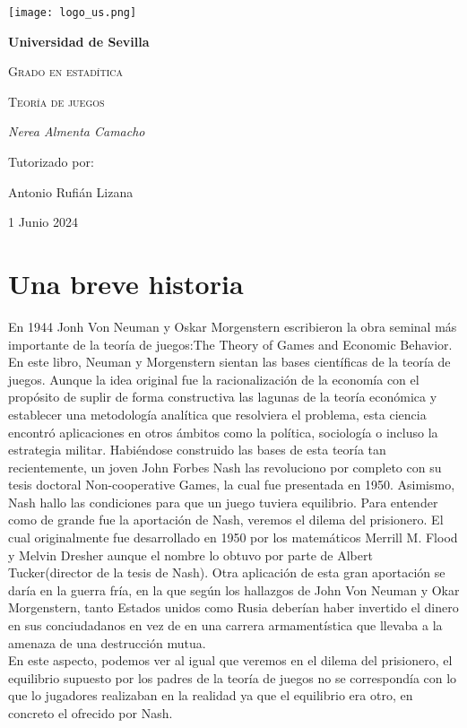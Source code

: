 \documentclass[10pt,a4paper]{book}
\begin{document}
\begin{titlepage}
\centering
{\texttt{[image: logo\_us.png]}\par}
\vspace{1cm}
{\bfseries\LARGE Universidad de Sevilla \par}
\vspace{1cm}
{\scshape\Large Grado en estad\'itica \par}
\vspace{3cm}
{\scshape\Huge Teor\'ia de juegos \par}
\vspace{3cm}
{\itshape\Large Nerea Almenta Camacho \par}
\vfill
{\Large Tutorizado por: \par}
{\Large Antonio Rufián Lizana \par}
\vfill
{\Large 1 Junio 2024 \par}
\end{titlepage} 

\tableofcontents
	
\newpage
	
	
\chapter{Una breve historia}

En 1944 Jonh Von Neuman y Oskar Morgenstern escribieron la obra seminal
más importante de la teoría de juegos:The Theory of Games and Economic
Behavior. En este libro, Neuman y Morgenstern sientan las bases científicas de
la teoría de juegos. Aunque la idea original fue la racionalización de la economía con el propósito de suplir de forma constructiva las lagunas de la teoría económica y establecer una metodología analítica que resolviera el problema, esta ciencia encontró aplicaciones en otros ámbitos como la política, sociología o incluso la estrategia militar.
Habiéndose construido las bases de esta teoría tan recientemente, un joven John Forbes Nash las revoluciono por completo con su tesis doctoral Non-cooperative
Games, la cual fue presentada en 1950. Asimismo, Nash hallo las condiciones
para que un juego tuviera equilibrio. Para entender como de grande fue la aportación de Nash, veremos el dilema del prisionero. El cual originalmente fue desarrollado en 1950 por los matemáticos Merrill M. Flood y Melvin Dresher aunque el nombre lo obtuvo por parte de Albert Tucker(director de la tesis de Nash).	Otra aplicación de esta gran aportación se daría en la guerra fría, en la que según los hallazgos de John Von Neuman y Okar Morgenstern, tanto Estados unidos como Rusia deberían haber invertido el dinero en sus conciudadanos en vez de en una carrera armamentística que llevaba a la amenaza de una destrucción mutua. \\
En este aspecto, podemos ver al igual que veremos en el dilema del prisionero,  el equilibrio supuesto por los padres de la teoría de juegos no se correspondía con lo que lo jugadores realizaban en la realidad ya que el equilibrio era otro, en concreto el ofrecido por Nash.\\
\end{document}
